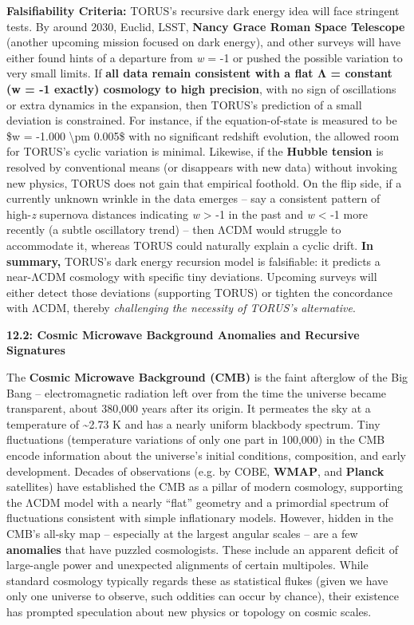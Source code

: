 \textbf{Falsifiability Criteria:} TORUS's recursive dark energy idea
will face stringent tests. By around 2030, Euclid, LSST, \textbf{Nancy
Grace Roman Space Telescope} (another upcoming mission focused on dark
energy), and other surveys will have either found hints of a departure
from \emph{w} = -1 or pushed the possible variation to very small
limits. If \textbf{all data remain consistent with a flat Λ = constant
(w = -1 exactly) cosmology to high precision}, with no sign of
oscillations or extra dynamics in the expansion, then TORUS's prediction
of a small deviation is constrained. For instance, if the
equation-of-state is measured to be \$w = -1.000 \textbackslash{}pm
0.005\$ with no significant redshift evolution, the allowed room for
TORUS's cyclic variation is minimal. Likewise, if the \textbf{Hubble
tension} is resolved by conventional means (or disappears with new data)
without invoking new physics, TORUS does not gain that empirical
foothold. On the flip side, if a currently unknown wrinkle in the data
emerges -- say a consistent pattern of high-\emph{z} supernova distances
indicating \emph{w} \textgreater{} -1 in the past and \emph{w}
\textless{} -1 more recently (a subtle oscillatory trend) -- then ΛCDM
would struggle to accommodate it, whereas TORUS could naturally explain
a cyclic drift. \textbf{In summary,} TORUS's dark energy recursion model
is falsifiable: it predicts a near-ΛCDM cosmology with specific tiny
deviations. Upcoming surveys will either detect those deviations
(supporting TORUS) or tighten the concordance with ΛCDM, thereby
\emph{challenging the necessity of TORUS's alternative}​.

\textbf{12.2: Cosmic Microwave Background Anomalies and Recursive
Signatures}

The \textbf{Cosmic Microwave Background (CMB)} is the faint afterglow of
the Big Bang -- electromagnetic radiation left over from the time the
universe became transparent, about 380,000 years after its origin. It
permeates the sky at a temperature of \textasciitilde{}2.73 K and has a
nearly uniform blackbody spectrum. Tiny fluctuations (temperature
variations of only one part in 100,000) in the CMB encode information
about the universe's initial conditions, composition, and early
development. Decades of observations (e.g. by COBE, \textbf{WMAP}, and
\textbf{Planck} satellites) have established the CMB as a pillar of
modern cosmology, supporting the ΛCDM model with a nearly ``flat''
geometry and a primordial spectrum of fluctuations consistent with
simple inflationary models. However, hidden in the CMB's all-sky map --
especially at the largest angular scales -- are a few \textbf{anomalies}
that have puzzled cosmologists. These include an apparent deficit of
large-angle power and unexpected alignments of certain multipoles. While
standard cosmology typically regards these as statistical flukes (given
we have only one universe to observe, such oddities can occur by
chance), their existence has prompted speculation about new physics or
topology on cosmic scales.

